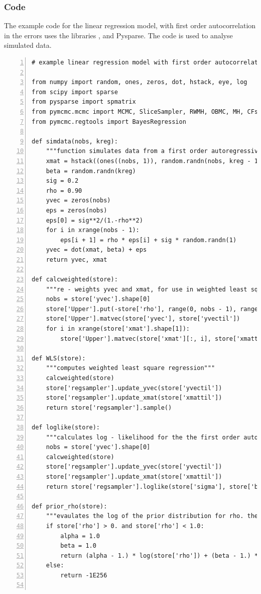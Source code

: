 \documentclass[article]{jss}
\begin{document}
\subsubsection{Code}

The example code for the linear regression model, with first order
autocorrelation in the errors uses the  libraries
,  and Pysparse. The code is used to analyse
simulated data.


\begin{lstlisting}[basicstyle={\scriptsize},numbers=left,tabsize=4]
# example linear regression model with first order autocorrelation in the errors

from numpy import random, ones, zeros, dot, hstack, eye, log
from scipy import sparse
from pysparse import spmatrix
from pymcmc.mcmc import MCMC, SliceSampler, RWMH, OBMC, MH, CFsampler
from pymcmc.regtools import BayesRegression 

def simdata(nobs, kreg):
    """function simulates data from a first order autoregressive regression"""
    xmat = hstack((ones((nobs, 1)), random.randn(nobs, kreg - 1)))
    beta = random.randn(kreg)
    sig = 0.2
    rho = 0.90
    yvec = zeros(nobs)
    eps = zeros(nobs)
    eps[0] = sig**2/(1.-rho**2)
    for i in xrange(nobs - 1):
        eps[i + 1] = rho * eps[i] + sig * random.randn(1)
    yvec = dot(xmat, beta) + eps
    return yvec, xmat

def calcweighted(store):
    """re - weights yvec and xmat, for use in weighted least squares regression"""
    nobs = store['yvec'].shape[0]
    store['Upper'].put(-store['rho'], range(0, nobs - 1), range(1, nobs))
    store['Upper'].matvec(store['yvec'], store['yvectil'])
    for i in xrange(store['xmat'].shape[1]):
        store['Upper'].matvec(store['xmat'][:, i], store['xmattil'][:, i])

def WLS(store):
    """computes weighted least square regression"""
    calcweighted(store)
    store['regsampler'].update_yvec(store['yvectil'])
    store['regsampler'].update_xmat(store['xmattil'])
    return store['regsampler'].sample()

def loglike(store):
    """calculates log - likelihood for the the first order autoregressive regression model"""
    nobs = store['yvec'].shape[0]
    calcweighted(store)
    store['regsampler'].update_yvec(store['yvectil'])
    store['regsampler'].update_xmat(store['xmattil'])
    return store['regsampler'].loglike(store['sigma'], store['beta'])

def prior_rho(store):
    """evaulates the log of the prior distribution for rho. the beta distribution is used"""
    if store['rho'] > 0. and store['rho'] < 1.0:
        alpha = 1.0
        beta = 1.0
        return (alpha - 1.) * log(store['rho']) + (beta - 1.) * log(1.-store['rho'])
    else:
        return -1E256


\end{lstlisting}
\end{document}
